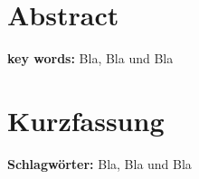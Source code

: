 \chapter*{Abstract}
\label{ch:Abstract}
\lipsum[1-3]

\textbf{key words:} Bla, Bla und Bla

\newpage






\chapter*{Kurzfassung}
\label{ch:Kurzfassung}
\lipsum[1-3]

\textbf{Schlagwörter:} Bla, Bla und Bla







